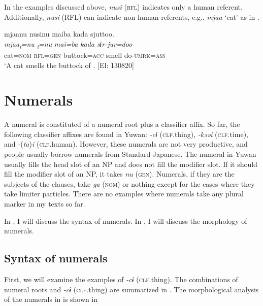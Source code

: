 \z

  In the examples discussed above, \textit{nusi} (\textsc{rfl}) indicates only a human referent. Additionally, \textit{nusi} (RFL) can indicate non-human referents, e.g., \textit{mjaa} ‘cat’ as in .

\ea \label{ex:7:11}{\TM}
\glll  mjaanu  nusinu  maiba  kada  sjuttoo.\\
\textit{mjaa\textsubscript{i}}\textit{=nu}  \textit{\textsubscript{i}}\textit{=nu}  \textit{mai=ba}  \textit{kada}  \textit{sɨr-jur=doo}\\
cat=\textsc{nom}  \textsc{rfl}=\textsc{gen}  buttock=\textsc{acc}  smell  do-\textsc{umrk}=\textsc{ass}\\
\glt ‘A cat smells the buttock of . [El: 130820]

\z

\section{Numerals}

A numeral is constituted of a numeral root plus a classifier affix. So far, the following classifier affixes are found in Yuwan: \textit{{}-cɨ} (\textsc{clf}.thing), \textit{{}-kəəi} (\textsc{clf}.time), and \textit{{}-}(\textit{ta})\textit{i} (\textsc{clf}.human). However, these numerals are not very productive, and people usually borrow numerals from Standard Japanese. The numeral in Yuwan usually fills the head slot of an NP and does not fill the modifier slot. If it should fill the modifier slot of an NP, it takes \textit{nu} (\textsc{gen}). Numerals, if they are the subjects of the clauses, take \textit{ga} (\textsc{nom}) or nothing except for the cases where they take limiter particles. There are no examples where numerals take any plural marker in my texts so far.

  In , I will discuss the syntax of numerals. In , I will discuss the morphology of numerals.

\subsection{Syntax of numerals}

First, we will examine the examples of \textit{{}-cɨ} (\textsc{clf}.thing). The combinations of numeral roots and \textit{{}-cɨ} (\textsc{clf}.thing) are summarized in . The morphological analysis of the numerals in  is shown in 

